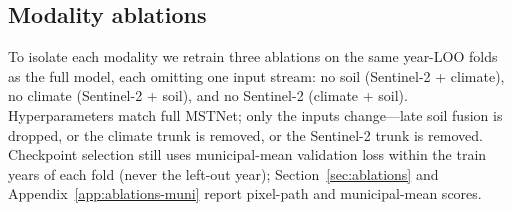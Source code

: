 \subsection{Modality ablations}
\label{sec:exp-ablations}
To isolate each modality we retrain three ablations on the same year-LOO folds as the full model, each omitting one input stream: no soil (Sentinel-2 + climate), no climate (Sentinel-2 + soil), and no Sentinel-2 (climate + soil).
Hyperparameters match full MSTNet; only the inputs change---late soil fusion is dropped, or the climate trunk is removed, or the Sentinel-2 trunk is removed.
Checkpoint selection still uses municipal-mean validation loss within the train years of each fold (never the left-out year); Section~\ref{sec:ablations} and Appendix~\ref{app:ablations-muni} report pixel-path and municipal-mean scores.
